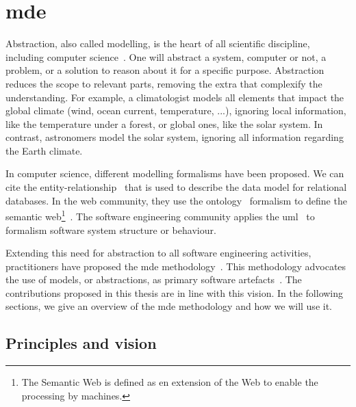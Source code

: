 \section[Model-Driven Engineering]{\glsdesc{mde}}
\label{sec:back:mde}

Abstraction, also called modelling, is the heart of all scientific discipline, including computer science~\cite{DBLP:journals/cacm/Kramer07}.
One will abstract a system, computer or not, a problem, or a solution to reason about it for a specific purpose.
Abstraction reduces the scope to relevant parts, removing the extra that complexify the understanding.
For example, a climatologist models all elements that impact the global climate (wind, ocean current, temperature, ...), ignoring local information, like the temperature under a forest, or global ones, like the solar system.
In contrast, astronomers model the solar system, ignoring all information regarding the Earth climate.

In computer science, different modelling formalisms have been proposed. 
We can cite the entity-relationship~\cite{DBLP:journals/tods/Chen76} that is used to describe the data model for relational databases.
In the web community, they use the ontology~\cite{DBLP:journals/ijmms/Gruber95} formalism to define the semantic web\footnote{The Semantic Web is defined as en extension of the Web to enable the processing by machines.}~\cite{berners2001semantic}.
The software engineering community applies the \gls{uml}~\cite{omg2017umlspec} to formalism software system structure or behaviour.

Extending this need for abstraction to all software engineering activities, practitioners have proposed the \gls{mde} methodology~\cite{DBLP:journals/computer/Schmidt06,DBLP:conf/ifm/Kent02}.
This methodology advocates the use of models, or abstractions, as primary software artefacts~\cite{DBLP:journals/software/WhittleHR14}.
The contributions proposed in this thesis are in line with this vision.
In the following sections, we give an overview of the \gls{mde} methodology and how we will use it.


\subsection{Principles and vision}

